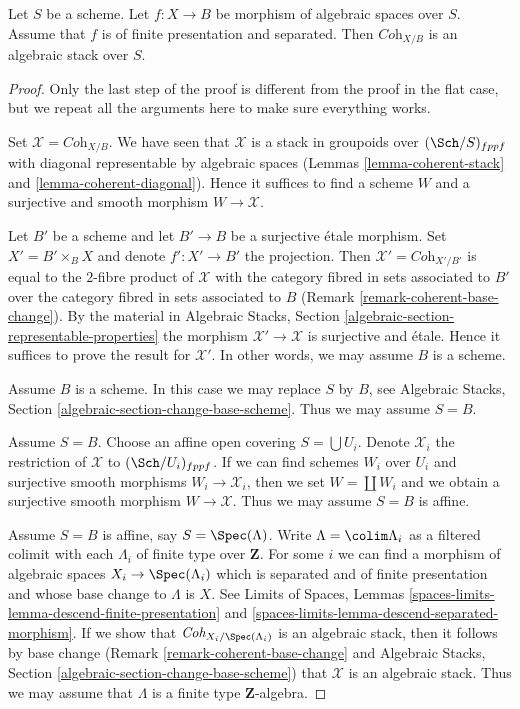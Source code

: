 \begin{theorem}
\label{theorem-coherent-algebraic-general}
Let $S$ be a scheme. Let $f : X \to B$ be morphism of algebraic spaces
over $S$. Assume that $f$ is of finite presentation and separated. Then
$\textit{Coh}_{X/B}$ is an algebraic stack over $S$.
\end{theorem}

\begin{proof}
Only the last step of the proof is different from the proof
in the flat case, but we repeat all the arguments here to make 
sure everything works.

\medskip\noindent
Set $\mathcal{X} = \textit{Coh}_{X/B}$. We have seen that $\mathcal{X}$
is a stack in groupoids over $(\Sch/S)_{fppf}$ with diagonal representable
by algebraic spaces
(Lemmas \ref{lemma-coherent-stack} and \ref{lemma-coherent-diagonal}).
Hence it suffices to find a scheme $W$ and a surjective and smooth
morphism $W \to \mathcal{X}$.

\medskip\noindent
Let $B'$ be a scheme and let $B' \to B$ be a surjective \'etale morphism.
Set $X' = B' \times_B X$ and denote $f' : X' \to B'$ the projection.
Then $\mathcal{X}' = \textit{Coh}_{X'/B'}$ is equal to the $2$-fibre
product of $\mathcal{X}$ with the category fibred in sets
associated to $B'$ over the category fibred in sets associated to $B$
(Remark \ref{remark-coherent-base-change}). By the material in
Algebraic Stacks, Section \ref{algebraic-section-representable-properties}
the morphism $\mathcal{X}' \to \mathcal{X}$ is surjective and \'etale.
Hence it suffices to prove the result for $\mathcal{X}'$.
In other words, we may assume $B$ is a scheme.

\medskip\noindent
Assume $B$ is a scheme. In this case we may replace $S$ by $B$, see
Algebraic Stacks, Section \ref{algebraic-section-change-base-scheme}.
Thus we may assume $S = B$.

\medskip\noindent
Assume $S = B$. Choose an affine open covering $S = \bigcup U_i$.
Denote $\mathcal{X}_i$ the restriction of $\mathcal{X}$ to
$(\Sch/U_i)_{fppf}$. If we can find schemes $W_i$ over $U_i$ and
surjective smooth morphisms $W_i \to \mathcal{X}_i$, then we
set $W = \coprod W_i$ and we obtain a surjective smooth morphism
$W \to \mathcal{X}$. Thus we may assume $S = B$ is affine.

\medskip\noindent
Assume $S = B$ is affine, say $S = \Spec(\Lambda)$.
Write $\Lambda = \colim \Lambda_i$ as a filtered colimit with each $\Lambda_i$
of finite type over $\mathbf{Z}$. For some $i$ we can find
a morphism of algebraic spaces $X_i \to \Spec(\Lambda_i)$
which is separated and of finite presentation and whose base change
to $\Lambda$ is $X$. See Limits of Spaces, Lemmas
\ref{spaces-limits-lemma-descend-finite-presentation} and
\ref{spaces-limits-lemma-descend-separated-morphism}.
If we show that $\textit{Coh}_{X_i/\Spec(\Lambda_i)}$ is an
algebraic stack, then it follows by base change
(Remark \ref{remark-coherent-base-change} and
Algebraic Stacks, Section \ref{algebraic-section-change-base-scheme})
that $\mathcal{X}$ is an algebraic stack.
Thus we may assume that $\Lambda$ is a finite type $\mathbf{Z}$-algebra.


\end{proof}
